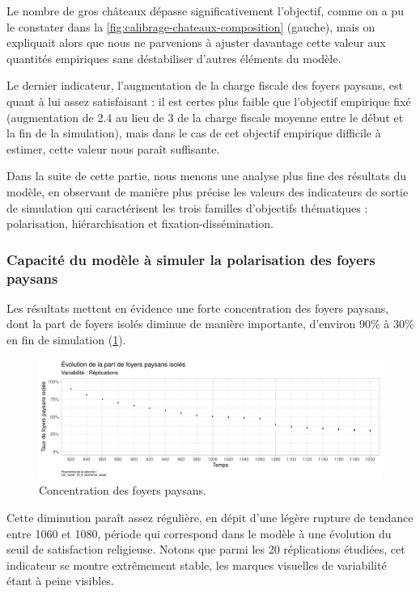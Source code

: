 Le nombre de gros châteaux dépasse significativement l'objectif, comme on a pu le constater dans la \cref{fig:calibrage-chateaux-composition} (gauche), mais on expliquait alors que nous ne parvenions à ajuster davantage cette valeur aux quantités empiriques sans déstabiliser d'autres éléments du modèle.

Le dernier indicateur, l'augmentation de la charge fiscale des foyers paysans, est quant à lui assez satisfaisant : il est certes plus faible que l'objectif empirique fixé (augmentation de 2.4 au lieu de 3 de la charge fiscale moyenne entre le début et la fin de la simulation), mais dans le cas de cet objectif empirique difficile à estimer, cette valeur nous paraît suffisante.

Dans la suite de cette partie, nous menons une analyse plus fine des résultats du modèle, en observant de manière plus précise les valeurs des indicateurs de sortie de simulation qui caractérisent les \og trois familles\fg{} d'objectifs thématiques : polarisation, hiérarchisation et fixation-dissémination.

\subsubsection{Capacité du modèle à simuler la polarisation des foyers paysans}

Les résultats mettent en évidence une forte concentration des foyers paysans, dont la part de foyers isolés diminue de manière importante, d'environ 90\% à 30\% en fin de simulation (\cref{fig:results-concentration-fp}).

\begin{figure}[H]
	\centering
	\includegraphics[width=\linewidth]{img/results_6_6/FP_Concentration_Haut.pdf}
	\caption{Concentration des foyers paysans.}
	\label{fig:results-concentration-fp}
\end{figure}

Cette diminution paraît assez régulière, en dépit d'une légère rupture de tendance entre 1060 et 1080, période qui correspond dans le modèle à une évolution du seuil de satisfaction religieuse.
Notons que parmi les 20 réplications étudiées, cet indicateur se montre extrêmement stable, les marques visuelles de variabilité étant à peine visibles.

